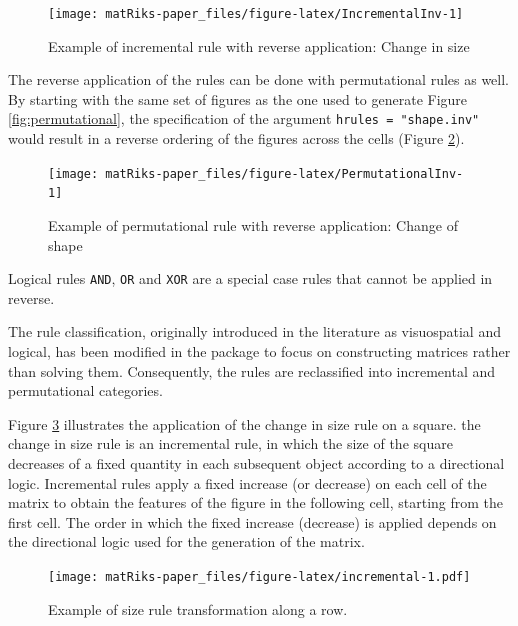 \begin{figure}

{\centering \texttt{[image: matRiks-paper\_files/figure-latex/IncrementalInv-1]} 

}

\caption{Example of incremental rule with reverse application: Change in size}\label{fig:IncrementalInv}
\end{figure}

The reverse application of the rules can be done with permutational rules as well.
By starting with the same set of figures as the one used to generate Figure \ref{fig:permutational}, the specification of the argument \texttt{hrules\ =\ "shape.inv"} would result in a reverse ordering of the figures across the cells (Figure \ref{fig:PermutationalInv}).

\begin{figure}

{\centering \texttt{[image: matRiks-paper\_files/figure-latex/PermutationalInv-1]} 

}

\caption{Example of  permutational rule with reverse application: Change of shape}\label{fig:PermutationalInv}
\end{figure}

Logical rules \texttt{AND}, \texttt{OR} and \texttt{XOR} are a special case rules that cannot be applied in reverse.

The rule classification, originally introduced in the literature as visuospatial and logical, has been modified in the  package to focus on constructing matrices rather than solving them.
Consequently, the rules are reclassified into incremental and permutational categories.

Figure \ref{fig:incremental} illustrates the application of the change in size rule on a square.
the change in size rule is an incremental rule, in which the size of the square decreases of a fixed quantity in each subsequent object according to a directional logic.
Incremental rules apply a fixed increase (or decrease) on each cell of the matrix to obtain the features of the figure in the following cell, starting from the first cell.
The order in which the fixed increase (decrease) is applied depends on the directional logic used for the generation of the matrix.

\begin{figure}
\centering
\texttt{[image: matRiks-paper\_files/figure-latex/incremental-1.pdf]}
\caption{\label{fig:incremental}Example of size rule transformation along a row.}
\end{figure}

